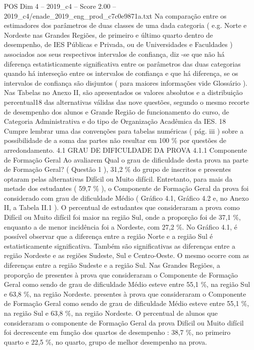 \begin{textsample}{POS Dim 4 – 2019\_c4 – Score 2.00 – 2019\_c4/enade\_2019\_eng\_prod\_c7c0e9871a.txt}
Na comparação entre os estimadores dos parâmetros de duas classes de uma dada categoria ( e.g.
Norte e Nordeste nas Grandes Regiões, de primeiro e último quarto dentro de desempenho, de IES Públicas e Privada, ou de Universidades e Faculdades ) associados aos seus respectivos intervalos de confiança, diz -se que não há diferença estatisticamente significativa entre os parâmetros das duas categorias quando há interseção entre os intervalos de confiança e que há diferença, se os intervalos de confiança são disjuntos ( para maiores informações vide Glossário ).
Nas Tabelas no Anexo II, são apresentados os valores absolutos e a distribuição percentual18 das alternativas válidas das nove questões, segundo o mesmo recorte de desempenho dos alunos e Grande Região de funcionamento do curso, de Categoria Administrativa e do tipo de Organização Acadêmica da IES. 18 Cumpre lembrar uma das convenções para tabelas numéricas ( pág. iii ) sobre a possibilidade de a soma das partes não resultar em 100 \% por questões de arredondamento. 4.1 GRAU DE DIFICULDADE DA PROVA 4.1.1 Componente de Formação Geral Ao avaliarem Qual o grau de dificuldade desta prova na parte de Formação Geral? ( Questão 1 ), 31,2 \% do grupo de inscritos e presentes optaram pelas alternativas Difícil ou Muito difícil.
Entretanto, para mais da metade dos estudantes ( 59,7 \% ), o Componente de Formação Geral da prova foi considerado com grau de dificuldade Médio ( Gráfico 4.1, Gráfico 4.2 e, no Anexo II, a Tabela II.1 ).
O percentual de estudantes que consideraram a prova como Difícil ou Muito difícil foi maior na região Sul, onde a proporção foi de 37,1 \%, enquanto a de menor incidência foi a Nordeste, com 27,2 \%.
No Gráfico 4.1, é possível observar que a diferença entre a região Norte e a região Sul é estatisticamente significativa.
Também são significativas as diferenças entre a região Nordeste e as regiões Sudeste, Sul e Centro-Oeste.
O mesmo ocorre com as diferenças entre a região Sudeste e a região Sul.
Nas Grandes Regiões, a proporção de presentes à prova que consideraram o Componente de Formação Geral como sendo de grau de dificuldade Médio esteve entre 55,1 \%, na região Sul e 63,8 \%, na região Nordeste. presentes à prova que consideraram o Componente de Formação Geral como sendo de grau de dificuldade Médio esteve entre 55,1 \%, na região Sul e 63,8 \%, na região Nordeste.
O percentual de alunos que consideraram o componente de Formação Geral da prova Difícil ou Muito difícil foi decrescente em função dos quartos de desempenho : 38,7 \%, no primeiro quarto e 22,5 \%, no quarto, grupo de melhor desempenho na prova.

\end{textsample}
